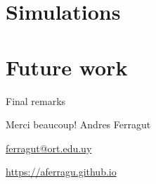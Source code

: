 \documentclass[aspectratio=169]{beamer}
\begin{document}
\section{Simulations}


\section{Future work}

\begin{frame}{Final remarks}
	
\end{frame}


\begin{frame}[plain]
	\vfill
	{\Huge \alert{Merci beaucoup!}}
	\vfill
	Andres Ferragut

	\smallskip

	\href{mailto://ferragut@ort.edu.uy}{\alert{ferragut@ort.edu.uy}}
	
	\smallskip

	\href{http://aferragu.github.io}{\alert{https://aferragu.github.io}}
\end{frame}
\end{document}
